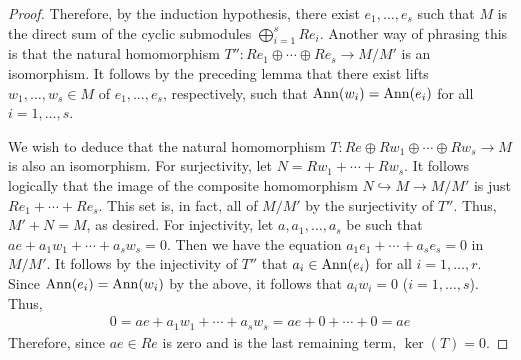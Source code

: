 \documentclass[../notes.tex]{subfiles}
\begin{document}
\begin{itemize}
\begin{proof}
        Therefore, by the induction hypothesis, there exist $e_1,\dots,e_s$ such that $M$ is the direct sum of the cyclic submodules $\bigoplus_{i=1}^sRe_i$. Another way of phrasing this is that the natural homomorphism $T'':Re_1\oplus\cdots\oplus Re_s\to M/M'$ is an isomorphism. It follows by the preceding lemma that there exist lifts $w_1,\dots,w_s\in M$ of $e_1,\dots,e_s$, respectively, such that $\operatorname{Ann}(w_i)=\operatorname{Ann}(e_i)$ for all $i=1,\dots,s$.\par
        We wish to deduce that the natural homomorphism $T:Re\oplus Rw_1\oplus\cdots\oplus Rw_s\to M$ is also an isomorphism. For surjectivity, let $N=Rw_1+\cdots+Rw_s$. It follows logically that the image of the composite homomorphism $N\hookrightarrow M\to M/M'$ is just $Re_1+\cdots+Re_s$. This set is, in fact, all of $M/M'$ by the surjectivity of $T''$. Thus, $M'+N=M$, as desired. For injectivity, let $a,a_1,\dots,a_s$ be such that $ae+a_1w_1+\cdots+a_sw_s=0$. Then we have the equation $a_1e_1+\cdots+a_se_s=0$ in $M/M'$. It follows by the injectivity of $T''$ that $a_i\in\operatorname{Ann}(e_i)$ for all $i=1,\dots,r$. Since $\operatorname{Ann}(e_i)=\operatorname{Ann}(w_i)$ by the above, it follows that $a_iw_i=0$ ($i=1,\dots,s$). Thus,
        \begin{align*}
            0 = ae+a_1w_1+\cdots+a_sw_s
            = ae+0+\cdots+0
            = ae
        \end{align*}
        Therefore, since $ae\in Re$ is zero and is the last remaining term, $\ker(T)=0$.
    \end{proof}
\end{itemize}
\end{document}
